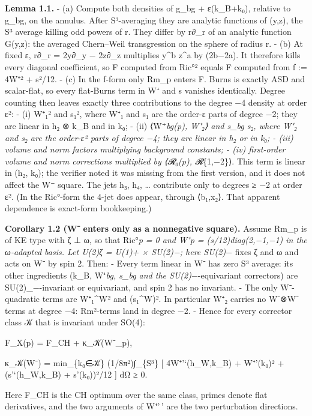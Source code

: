 \documentclass[
  10pt,
]{report}
\begin{document}
\textbf{Lemma 1.1.} - (a) Compute both densities of g\_bg + ε(k\_B+k₀),
relative to g\_bg, on the annulus. After S³-averaging they are analytic
functions of (y,z), the S³ average killing odd powers of r. They differ
by r∂\_r of an analytic function G(y,z): the averaged Chern--Weil
transgression on the sphere of radius r. - (b) At fixed ε, r∂\_r =
2y∂\_y − 2z∂\_z multiplies y\^{}b z\^{}a by (2b−2a). It therefore kills
every diagonal coefficient, so F computed from \textbar Ric°\textbar²
equals F computed from f := 4\textbar W⁺\textbar² + s²/12. - (c) In the
f-form only Rm\_p enters F. Burns is exactly ASD and scalar-flat, so
every flat-Burns term in W⁺ and s vanishes identically. Degree counting
then leaves exactly three contributions to the degree −4 density at
order ε²: - (i) \textbar W⁺₁\textbar² and s₁², where W⁺₁ and s₁ are the
order-ε parts of degree −2; they are linear in h₂ ⊗ k\_B and in k₀; -
(ii) ⟨W⁺\emph{bg(p), W⁺₂⟩ and s\_bg s₂, where W⁺₂ and s₂ are the
order-ε² parts of degree −4; they are linear in h₂ or in k₀; - (iii)
volume and norm factors multiplying background constants; - (iv)
first-order volume and norm corrections multiplied by ⟨𝓡₀(p),
𝓡}\{1,−2\}⟩. This term is linear in (h₂, k₀); the verifier noted it was
missing from the first version, and it does not affect the W⁻ square.
The jets h₃, h₄, \ldots{} contribute only to degrees ≥ −2 at order ε².
(In the Ric°-form the 4-jet does appear, through ⟨b₁,x₂⟩. That apparent
dependence is exact-form bookkeeping.)

\textbf{Corollary 1.2 (W⁻ enters only as a nonnegative square).} Assume
Rm\_p is of KE type with ζ ⊥ ω, so that Ric°\emph{p = 0 and W⁺\emph{p =
(s/12)diag(2,−1,−1) in the ω-adapted basis. Let U(2)\emph{ζ = U(1)}+ ×
SU(2)}−; here SU(2)}− fixes ζ and ω and acts on W⁻ by spin 2. Then: -
Every term linear in W⁻ has zero S³ average: its other ingredients
(k\_B, W⁺\emph{bg, s\_bg and the SU(2)}−-equivariant correctors) are
SU(2)\_−-invariant or equivariant, and spin 2 has no invariant. - The
only W⁻-quadratic terms are \textbar W⁺₁\^{}W\textbar² and (s₁\^{}W)².
In particular W⁺₂ carries no W⁻⊗W⁻ terms at degree −4: Rm²-terms land in
degree −2. - Hence for every corrector class 𝒦 that is invariant under
SO(4):

F\_X(p) = F\_CH + κ\_𝒦(W⁻\_p),

κ\_𝒦(W⁻) = min\_\{k₀∈𝒦\} (1/8π²)∫\_\{S³\} {[} 4\textbar W⁺'`(h\_W,k\_B)
+ W⁺'(k₀)\textbar² + (s'`(h\_W,k\_B) + s'(k₀))²/12 {]} dΩ ≥ 0.

Here F\_CH is the CH optimum over the same class, primes denote flat
derivatives, and the two arguments of W⁺'\,' are the two perturbation
directions.
\end{document}
